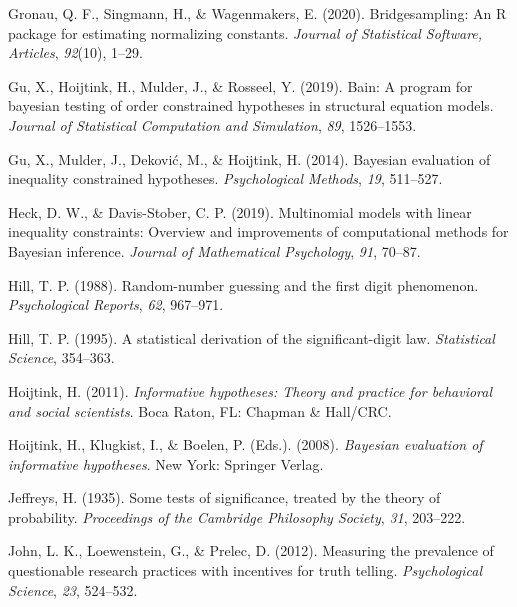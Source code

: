 \documentclass[
  english,
  man,floatsintext]{apa6}
\newlength{\cslhangindent}
\newenvironment{cslreferences}%
  {\setlength{\parindent}{0pt}%
  \everypar{\setlength{\hangindent}{\cslhangindent}}\ignorespaces}%
  {\par}
\begin{document}
\begin{cslreferences}
\leavevmode\hypertarget{ref-gronau2017bridgesampling}{}%
Gronau, Q. F., Singmann, H., \& Wagenmakers, E. (2020). Bridgesampling: An R package for estimating normalizing constants. \emph{Journal of Statistical Software, Articles}, \emph{92}(10), 1--29.

\leavevmode\hypertarget{ref-gu2019bain}{}%
Gu, X., Hoijtink, H., Mulder, J., \& Rosseel, Y. (2019). Bain: A program for bayesian testing of order constrained hypotheses in structural equation models. \emph{Journal of Statistical Computation and Simulation}, \emph{89}, 1526--1553.

\leavevmode\hypertarget{ref-gu2014bayesian}{}%
Gu, X., Mulder, J., Deković, M., \& Hoijtink, H. (2014). Bayesian evaluation of inequality constrained hypotheses. \emph{Psychological Methods}, \emph{19}, 511--527.

\leavevmode\hypertarget{ref-heck2019multinomial}{}%
Heck, D. W., \& Davis-Stober, C. P. (2019). Multinomial models with linear inequality constraints: Overview and improvements of computational methods for Bayesian inference. \emph{Journal of Mathematical Psychology}, \emph{91}, 70--87.

\leavevmode\hypertarget{ref-hill1988random}{}%
Hill, T. P. (1988). Random-number guessing and the first digit phenomenon. \emph{Psychological Reports}, \emph{62}, 967--971.

\leavevmode\hypertarget{ref-hill1995statistical}{}%
Hill, T. P. (1995). A statistical derivation of the significant-digit law. \emph{Statistical Science}, 354--363.

\leavevmode\hypertarget{ref-hoijtink2011informative}{}%
Hoijtink, H. (2011). \emph{Informative hypotheses: Theory and practice for behavioral and social scientists}. Boca Raton, FL: Chapman \& Hall/CRC.

\leavevmode\hypertarget{ref-hoijtink2008bayesian}{}%
Hoijtink, H., Klugkist, I., \& Boelen, P. (Eds.). (2008). \emph{Bayesian evaluation of informative hypotheses}. New York: Springer Verlag.

\leavevmode\hypertarget{ref-jeffreys1935some}{}%
Jeffreys, H. (1935). Some tests of significance, treated by the theory of probability. \emph{Proceedings of the Cambridge Philosophy Society}, \emph{31}, 203--222.

\leavevmode\hypertarget{ref-john2012measuring}{}%
John, L. K., Loewenstein, G., \& Prelec, D. (2012). Measuring the prevalence of questionable research practices with incentives for truth telling. \emph{Psychological Science}, \emph{23}, 524--532.


\end{cslreferences}
\end{document}
